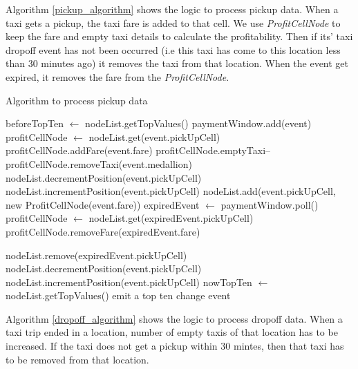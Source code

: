 Algorithm \ref{pickup_algorithm} shows the logic to process pickup data. When a taxi gets a pickup, the taxi fare is added to that cell. We use \textit{ProfitCellNode} to keep the fare and empty taxi details to calculate the profitability. Then if its' taxi dropoff event has not been occurred (i.e this taxi has come to this location less than 30 minutes ago) it removes the taxi from that location. When the event get expired, it removes the fare from the \textit{ProfitCellNode}. 

\begin{algorithm}
\caption{Algorithm to process pickup data}
\label{pickup_algorithm}
\begin{algorithmic}
\small
\STATE beforeTopTen $ \leftarrow $ nodeList.getTopValues()
\STATE paymentWindow.add(event)
	\STATE profitCellNode $ \leftarrow $ nodeList.get(event.pickUpCell)
	\STATE profitCellNode.addFare(event.fare)
		\STATE profitCellNode.emptyTaxi--
		\STATE profitCellNode.removeTaxi(event.medallion)
	\ENDIF
		\STATE nodeList.decrementPosition(event.pickUpCell)
	\ELSE
		\STATE nodeList.incrementPosition(event.pickUpCell)	
	\ENDIF
\ELSE
	\STATE nodeList.add(event.pickUpCell, new ProfitCellNode(event.fare))
\ENDIF
{}
	\STATE expiredEvent $ \leftarrow $ paymentWindow.poll()
	\STATE profitCellNode $ \leftarrow $ nodeList.get(expiredEvent.pickUpCell)
	\STATE profitCellNode.removeFare(expiredEvent.fare)
	
		\STATE nodeList.remove(expiredEvent.pickUpCell)
		\STATE nodeList.decrementPosition(event.pickUpCell)
	\ELSE
		\STATE nodeList.incrementPosition(event.pickUpCell)
	\ENDIF
\ENDWHILE
\STATE nowTopTen $ \leftarrow $ nodeList.getTopValues()
	\STATE emit a top ten change event
\ENDIF		 

\end{algorithmic}
\end{algorithm}

Algorithm \ref{dropoff_algorithm} shows the logic to process dropoff data. When a taxi trip ended in a location, number of empty taxis of that location has to be increased. If the taxi does not get a pickup within 30 mintes, then that taxi has to be removed from that location.

